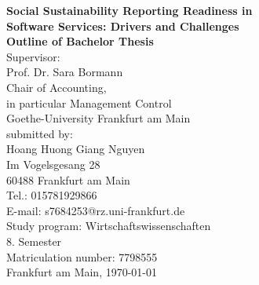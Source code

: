 \begin{titlepage}
    \begin{center}
        \vspace*{2cm}
        {\LARGE \textbf{Social Sustainability Reporting Readiness in \\[0.2cm] Software Services: Drivers and Challenges}}\\[2cm]
        {\Large \textbf{Outline of Bachelor Thesis}}\\[2cm]

        Supervisor:\\[0.5cm]
        Prof. Dr. Sara Bormann\\
        Chair of Accounting,\\
        in particular Management Control\\
        Goethe-University Frankfurt am Main\\[2cm]

        submitted by:\\[0.5cm]
        {Hoang Huong Giang Nguyen}\\
        {Im Vogelsgesang 28}\\
        {60488 Frankfurt am Main}\\
        Tel.: {015781929866}\\
        E-mail: {s7684253@rz.uni-frankfurt.de}\\
        Study program: {Wirtschaftswissenschaften}\\
        {8. Semester}\\
        Matriculation number: {7798555}\\[2cm]

        Frankfurt am Main, \today
    \end{center}
\end{titlepage}
